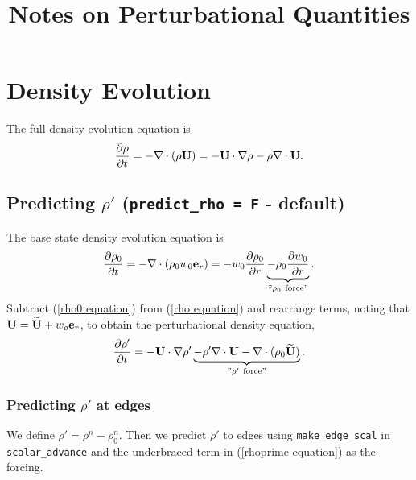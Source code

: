 \documentclass[11pt]{article}
\title{Notes on Perturbational Quantities}
\def\eb    {{\bf e}}
\def\Ub    {{\bf U}}
\def\Ubt   {\widetilde{\bf U}}
\begin{document}
\maketitle
\tableofcontents
\cleardoublepage

\section{Density Evolution}
The full density evolution equation is
\begin{equation}
\frac{\partial\rho}{\partial t} = -\nabla\cdot(\rho\Ub) = -\Ub\cdot\nabla\rho 
- \rho\nabla\cdot\Ub. \label{rho equation}
\end{equation}
\subsection{Predicting $\rho'$ ({\tt predict\_rho = F} - default)}
The base state density evolution equation is
\begin{equation}
\frac{\partial\rho_0}{\partial t} = -\nabla\cdot(\rho_0 w_0 \eb_r) = 
-w_0\frac{\partial\rho_0}{\partial r} 
\underbrace{-\rho_0\frac{\partial w_0}{\partial r}}_{"\rho_0 ~ \text{force}"}.
\label{rho0 equation}
\end{equation}
Subtract (\ref{rho0 equation}) from (\ref{rho equation}) and rearrange terms, noting that 
$\Ub = \Ubt + w_o\eb_r$, to obtain the perturbational density equation,
\begin{equation}
\frac{\partial\rho'}{\partial t} = -\Ub\cdot\nabla\rho' \underbrace{- \rho'\nabla\cdot\Ub 
- \nabla\cdot(\rho_0\Ubt)}_{"\rho' ~ \text{force}"}. 
\label{rhoprime equation}
\end{equation}
\subsubsection{Predicting $\rho'$ at edges}
We define $\rho' = \rho^n - \rho_0^n$.  Then we predict $\rho'$ to edges using 
{\tt make\_edge\_scal} in {\tt scalar\_advance} and the underbraced term in (\ref{rhoprime equation}) 
as the forcing.
\end{document}
